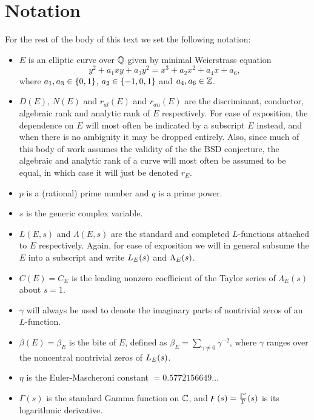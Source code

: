 
\section{Notation}\label{subsec:notation}

For the rest of the body of this text we set the following notation:
\begin{itemize}
\item $E$ is an elliptic curve over $\mathbb{Q}$ given by minimal Weierstrass equation
\begin{equation*}
y^2 + a_1 xy + a_3 y^2 = x^3 + a_2 x^2 + a_4 x + a_6,
\end{equation*}
 where $a_1, a_3 \in \left\{0,1\right\}$, $a_2 \in \left\{-1,0,1\right\}$ and $a_4,a_6 \in \mathbb{Z}$.
\item $D(E)$, $N(E)$ and $r_{al}(E)$  and $r_{an}(E)$ are the discriminant, conductor, algebraic rank and analytic rank of $E$ respectively. For ease of exposition, the dependence on $E$ will most often be indicated by a subscript $E$ instead, and when there is no ambiguity it may be dropped entirely. Also, since much of this body of work assumes the validity of the the BSD conjecture, the algebraic and analytic rank of a curve will most often be assumed to be equal, in which case it will just be denoted $r_E$.
\item $p$ is a (rational) prime number and $q$ is a prime power.
\item $s$ is the generic complex variable.
\item $L(E,s)$ and $\Lambda(E,s)$ are the standard and completed $L$-functions attached to $E$ respectively. Again, for ease of exposition we will in general subsume the $E$ into a subscript and write $L_E(s)$ and $\Lambda_E(s)$.
\item $C(E) = C_E$ is the leading nonzero coefficient of the Taylor series of $\Lambda_E(s)$ about $s=1$.
\item $\gamma$ will always be used to denote the imaginary parts of nontrivial zeros of an $L$-function.
\item $\beta(E) = \beta_E$ is the bite of $E$, defined as $\beta_E = \sum_{\gamma\ne 0} \gamma^{-2}$, where $\gamma$ ranges over the noncentral nontrivial zeros of $L_E(s)$.
\item $\eta$ is the Euler-Mascheroni constant $= 0.5772156649\ldots$
\item $\Gamma(s)$ is the standard Gamma function on $\mathbb{C}$, and $\digamma(s) = \frac{\Gamma^{\prime}}{\Gamma}(s)$ is its logarithmic derivative.
\end{itemize}

